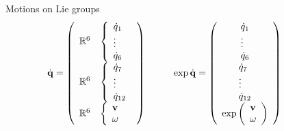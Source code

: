 \begin{frame} {Motions on Lie groups}
  $$\dot{\mathbf{q}}=
  \left(
  \begin{array}{ll}
    \mathbb{R}^6 &\left\{\begin{array}{l}\dot{q}_1 \\ \vdots \\ \dot{q}_6 \end{array}\right.\\
    \mathbb{R}^6 &\left\{\begin{array}{l} \dot{q}_7 \\ \vdots \\ \dot{q}_{12} \end{array}\right.\\
    \mathbb{R}^6 &\left\{\begin{array}{l} \mathbf{v}\\ \omega \end{array}\right.
  \end{array}\right) \hspace*{1cm}
  \exp\dot{\mathbf{q}}=
  \left(
  \begin{array}{c}
    \begin{array}{l}\dot{q}_1 \\ \vdots \\ \dot{q}_6 \end{array}\\
    \begin{array}{l} \dot{q}_7 \\ \vdots \\ \dot{q}_{12} \end{array}\\
    \exp\left(\begin{array}{l} \mathbf{v}\\ \omega \end{array}\right)
  \end{array}\right) \hspace*{1cm}
  $$
\end{frame}

